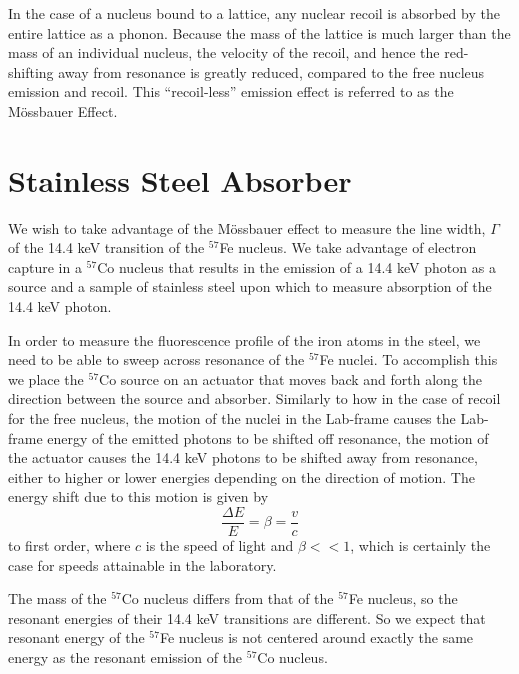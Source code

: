 \documentclass[paper=a4, fontsize=11pt, abstract=on]{scrartcl} %
\numberwithin{equation}{section}
\numberwithin{figure}{section}
\numberwithin{table}{section}
\begin{document}
\vline

In the case of a nucleus bound to a lattice, any nuclear recoil is
absorbed by the entire lattice as a phonon. Because the mass of the
lattice is much larger than the mass of an individual nucleus, the
velocity of the recoil, and hence the red-shifting away from resonance
is greatly reduced, compared to the free nucleus emission and
recoil. This ``recoil-less'' emission effect is referred to as the
M\"{o}ssbauer Effect.

\section{Stainless Steel Absorber}
\label{sec:steel}

We wish to take advantage of the M\"{o}ssbauer effect to measure the
line width, $\Gamma$ of the 14.4 keV transition of the $^{57}$Fe
nucleus. We take advantage of electron capture in a $^{57}$Co nucleus
that results in the emission of a 14.4 keV photon as a source and a
sample of stainless steel upon which to measure absorption of the 14.4
keV photon. 

\vline

In order to measure the fluorescence profile of the iron
atoms in the steel, we need to be able to sweep across resonance of
the $^{57}$Fe nuclei. To accomplish this we place the $^{57}$Co source
on an actuator that moves back and forth along the direction between
the source and absorber. Similarly to how in the case of recoil for
the free nucleus, the motion of the nuclei in the Lab-frame causes the
Lab-frame energy of the emitted photons to be shifted off resonance,
the motion of the actuator causes the 14.4 keV photons to be shifted
away from resonance, either to higher or lower energies depending on
the direction of motion. The energy shift due to this motion is given
by
\begin{equation}
  \label{eq:shift}
  \frac{\Delta E}{E} = \beta = \frac{v}{c}
\end{equation}
to first order, where $c$ is the speed of light and $\beta<<1$,  which is certainly the case for
speeds attainable in the laboratory.

\vline

The mass of the $^{57}$Co nucleus differs from that of the $^{57}$Fe
nucleus, so the resonant energies of their 14.4 keV transitions are
different. So we expect that resonant energy of the $^{57}$Fe nucleus
is not centered around exactly the same energy as the resonant
emission of the $^{57}$Co nucleus.
\end{document}
